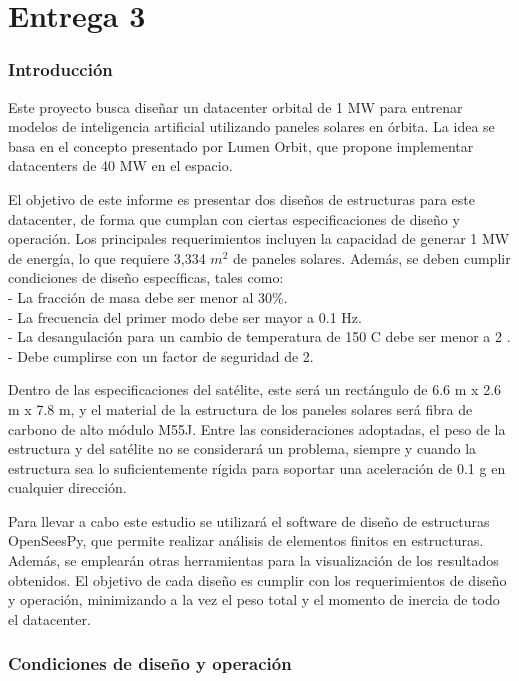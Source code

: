 \part{Entrega 3}

\section{Introducción}

Este proyecto busca diseñar un datacenter orbital de 1 MW para entrenar modelos de inteligencia artificial utilizando paneles solares en órbita. La idea se basa en el concepto presentado por Lumen Orbit, que propone implementar datacenters de 40 MW en el espacio.

El objetivo de este informe es presentar dos diseños de estructuras para este datacenter, de forma que cumplan con ciertas especificaciones de diseño y operación. Los principales requerimientos incluyen la capacidad de generar 1 MW de energía, lo que requiere 3,334 $m^2$ de paneles solares. Además, se deben cumplir condiciones de diseño específicas, tales como:\\
- La fracción de masa debe ser menor al 30\%.\\
- La frecuencia del primer modo debe ser mayor a 0.1 Hz.\\
- La desangulación para un cambio de temperatura de 150 \textdegree{}C debe ser menor a 2 \textdegree.\\
- Debe cumplirse con un factor de seguridad de 2.

Dentro de las especificaciones del satélite, este será un rectángulo de 6.6 m x 2.6 m x 7.8 m, y el material de la estructura de los paneles solares será fibra de carbono de alto módulo M55J. Entre las consideraciones adoptadas, el peso de la estructura y del satélite no se considerará un problema, siempre y cuando la estructura sea lo suficientemente rígida para soportar una aceleración de 0.1 g en cualquier dirección.

Para llevar a cabo este estudio se utilizará el software de diseño de estructuras OpenSeesPy, que permite realizar análisis de elementos finitos en estructuras. Además, se emplearán otras herramientas para la visualización de los resultados obtenidos. El objetivo de cada diseño es cumplir con los requerimientos de diseño y operación, minimizando a la vez el peso total y el momento de inercia de todo el datacenter.

\newpage
\section{Condiciones de diseño y operación}

